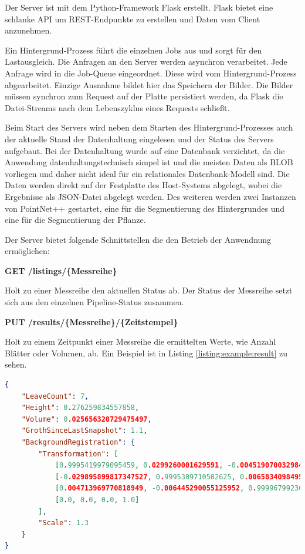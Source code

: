 \documentclass[12pt,titlepage, twoside]{article}
\begin{document}
Der Server ist mit dem Python-Framework Flask erstellt. Flask bietet eine schlanke API um REST-Endpunkte zu erstellen und Daten vom Client anzunehmen. 

Ein Hintergrund-Prozess führt die einzelnen Jobs aus und sorgt für den Lastausgleich. Die Anfragen an den Server werden asynchron verarbeitet. 
Jede Anfrage wird in die Job-Queue eingeordnet. Diese wird vom Hintergrund-Prozess abgearbeitet.
Einzige Ausnahme bildet hier das Speichern der Bilder. Die Bilder müssen synchron zum Request auf der Platte persistiert werden, da Flask die Datei-Streams nach dem Lebenszyklus eines Requests schließt.

Beim Start des Servers wird neben dem Starten des Hintergrund-Prozesses auch der aktuelle Stand der Datenhaltung eingelesen und der Status des Servers aufgebaut. 
Bei der Datenhaltung wurde auf eine Datenbank verzichtet, da die Anwendung datenhaltungstechnisch simpel ist und die meisten Daten als BLOB \cite{sears2007blob} vorliegen und daher nicht ideal für ein relationales Datenbank-Modell sind. 
Die Daten werden direkt auf der Festplatte des Host-Systems abgelegt, wobei die Ergebnisse als JSON-Datei abgelegt werden.
Des weiteren werden zwei Instanzen von PointNet++ gestartet, eine für die Segmentierung des Hintergrundes und eine für die Segmentierung der Pflanze.

Der Server bietet folgende Schnittstellen die den Betrieb der Anwendnung ermöglichen:

\textbf{GET /listings/\{Messreihe\}}

Holt zu einer Messreihe den aktuellen Status ab. Der Status der Messreihe setzt sich aus den einzelnen Pipeline-Status zusammen.

\textbf{PUT /results/\{Messreihe\}/\{Zeitstempel\}}

Holt zu einem Zeitpunkt einer Messreihe die ermittelten Werte, wie Anzahl Blätter oder Volumen, ab. Ein Beispiel ist in Listing \ref{listing:example:result} zu sehen.

\begin{lstlisting}[language=json, caption={Beispiel Ergebnisse eines Zeitstempels}, captionpos=b, label=listing:example:result]
{
    "LeaveCount": 7,
    "Height": 0.276259834557858,
    "Volume": 0.025656320729475497,
    "GrothSinceLastSnapshot": 1.1,
    "BackgroundRegistration": {
        "Transformation": [
            [0.9995419979095459, 0.0299260001629591, -0.004519070032984018, -0.030479200184345245], 
            [-0.029895899817347527, 0.9995309710502625, 0.0065834098495543, 0.025272000581026077], 
            [0.004713969770818949, -0.006445290055125952, 0.9999679923057556, 0.0013244400033727288], 
            [0.0, 0.0, 0.0, 1.0]
        ],
        "Scale": 1.3
    }
}
\end{lstlisting}
\end{document}
